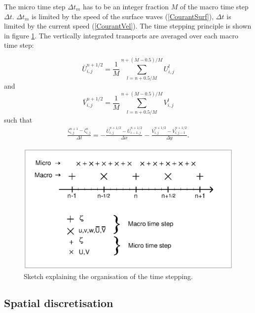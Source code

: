 The micro time step $\Delta t_m$ has to be an integer fraction $M$ of the
macro time step $\Delta t$. $\Delta t_m$ is limited by the speed of the
surface waves (\ref{CourantSurf}),
$\Delta t$ is limited by the current speed (\ref{CourantVel}).
The time stepping principle is shown in figure \ref{figtimegrid}.
The vertically integrated transports are averaged over each macro time
step:

\begin{equation}\label{Mdef} 
\bar U_{i,j}^{n+1/2} = \frac{1}{M}\sum_{l=n+0.5/M}^{n+(M-0.5)/M} U^l_{i,j}
\end{equation}
and
\begin{equation}
\bar V_{i,j}^{n+1/2} = \frac{1}{M}\sum_{l=n+0.5/M}^{n+(M-0.5)/M} V^l_{i,j}
\end{equation}
such that
\begin{equation}
\begin{array}{l}
\displaystyle
\frac{\zeta_{i,j}^{n+1}-\zeta_{i,j}^{n}}{\Delta t}=
-\frac{\bar U_{i,j}^{n+1/2}-\bar U_{i-1,j}^{n+1/2}}{\Delta x}
-\frac{\bar V_{i,j}^{n+1/2}-\bar V_{i,j-1}^{n+1/2}}{\Delta y}.
\end{array}
\end{equation}


\begin{figure}
\begin{center}
\includegraphics[width=12cm,bbllx=20,bblly=327,bburx=493,bbury=605]{./figures/gridtime.ps}
\caption{Sketch explaining the organisation of the time stepping.
}\label{figtimegrid}
\end{center}
\end{figure}


\subsection{Spatial discretisation}\label{Section_spatial_discretisation}



